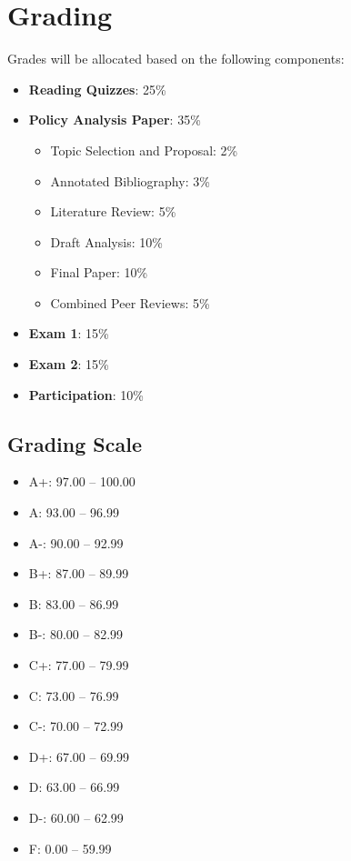 \documentclass[11pt, letterpaper]{article}
\begin{document}
\section{Grading}
Grades will be allocated based on the following components:
\begin{itemize}
    \item \textbf{Reading Quizzes}: 25\%
    \item \textbf{Policy Analysis Paper}: 35\%
        \begin{itemize}
            \item Topic Selection and Proposal: 2\%
            \item Annotated Bibliography: 3\%
            \item Literature Review: 5\%
            \item Draft Analysis: 10\%
            \item Final Paper: 10\%
            \item Combined Peer Reviews: 5\%
        \end{itemize}
    \item \textbf{Exam 1}: 15\%
    \item \textbf{Exam 2}: 15\% 
    \item \textbf{Participation}: 10\%   
\end{itemize}

\subsection*{Grading Scale}

\begin{itemize}
    \item A+: 97.00 -- 100.00
    \item A: 93.00 -- 96.99
    \item A-: 90.00 -- 92.99
    \item B+: 87.00 -- 89.99
    \item B: 83.00 -- 86.99
    \item B-: 80.00 -- 82.99
    \item C+: 77.00 -- 79.99
    \item C: 73.00 -- 76.99
    \item C-: 70.00 -- 72.99
    \item D+: 67.00 -- 69.99
    \item D: 63.00 -- 66.99
    \item D-: 60.00 -- 62.99
    \item F: 0.00 -- 59.99
\end{itemize}
\end{document}
